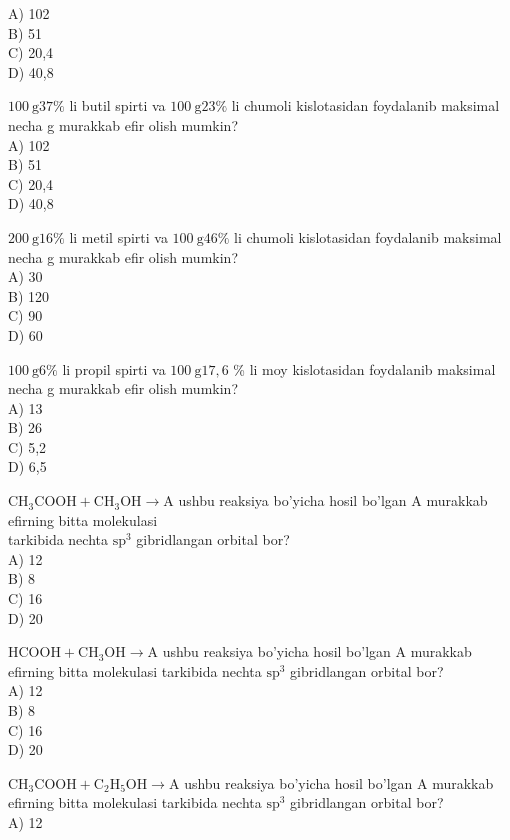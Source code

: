 A) 102\\
B) 51\\
C) 20,4\\
D) 40,8
  \item $100 \mathrm{~g} 37 \%$ li butil spirti va $100 \mathrm{~g} 23 \%$ li chumoli kislotasidan foydalanib maksimal necha g murakkab efir olish mumkin?\\
A) 102\\
B) 51\\
C) 20,4\\
D) 40,8
  \item $200 \mathrm{~g} 16 \%$ li metil spirti va $100 \mathrm{~g} 46 \%$ li chumoli kislotasidan foydalanib maksimal necha g murakkab efir olish mumkin?\\
A) 30\\
B) 120\\
C) 90\\
D) 60
  \item $100 \mathrm{~g} 6 \%$ li propil spirti va $100 \mathrm{~g} 17,6$ \% li moy kislotasidan foydalanib maksimal necha g murakkab efir olish mumkin?\\
A) 13\\
B) 26\\
C) 5,2\\
D) 6,5
  \item $\mathrm{CH}_{3} \mathrm{COOH}+\mathrm{CH}_{3} \mathrm{OH} \rightarrow \mathrm{A}$ ushbu reaksiya bo'yicha hosil bo'lgan A murakkab efirning bitta molekulasi\\
tarkibida nechta $\mathrm{sp}^{3}$ gibridlangan orbital bor?\\
A) 12\\
B) 8\\
C) 16\\
D) 20
  \item $\mathrm{HCOOH}+\mathrm{CH}_{3} \mathrm{OH} \rightarrow \mathrm{A}$ ushbu reaksiya bo'yicha hosil bo'lgan A murakkab efirning bitta molekulasi tarkibida nechta $\mathrm{sp}^{3}$ gibridlangan orbital bor?\\
A) 12\\
B) 8\\
C) 16\\
D) 20
  \item $\mathrm{CH}_{3} \mathrm{COOH}+\mathrm{C}_{2} \mathrm{H}_{5} \mathrm{OH} \rightarrow \mathrm{A}$ ushbu reaksiya bo'yicha hosil bo'lgan A murakkab efirning bitta molekulasi tarkibida nechta $\mathrm{sp}^{3}$ gibridlangan orbital bor?\\
A) 12\\
